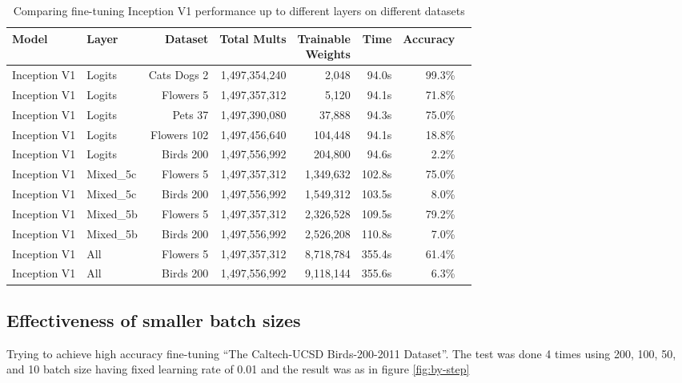 \begin{table*}\caption{Comparing fine-tuning Inception V1 performance up to different layers on different datasets}\label{table:fine-tune-inception-v1}
\centering
\begin{small}
\begin{tabularx}{\textwidth}{llrrrrrr}
\toprule
Model & Layer & Dataset & Total Mults & \makecell{Trainable \\ Weights} & Time & Accuracy \\
\midrule
Inception V1 & Logits   & Cats Dogs 2   & 1,497,354,240 &     2,048 &   94.0s & 99.3\% \\
Inception V1 & Logits   & Flowers 5     & 1,497,357,312 &     5,120 &   94.1s & 71.8\% \\
Inception V1 & Logits   & Pets 37       & 1,497,390,080 &    37,888 &   94.3s & 75.0\% \\
Inception V1 & Logits   & Flowers 102   & 1,497,456,640 &   104,448 &   94.1s & 18.8\% \\
Inception V1 & Logits   & Birds 200     & 1,497,556,992 &   204,800 &   94.6s & 2.2\% \\
\midrule
Inception V1 & Mixed\_5c & Flowers 5     &  1,497,357,312 & 1,349,632 & 102.8s & 75.0\% \\
Inception V1 & Mixed\_5c & Birds 200     &  1,497,556,992 & 1,549,312 & 103.5s & 8.0\% \\
\midrule
Inception V1 & Mixed\_5b & Flowers 5     &  1,497,357,312 & 2,326,528 & 109.5s & 79.2\% \\
Inception V1 & Mixed\_5b & Birds 200     &  1,497,556,992 & 2,526,208 & 110.8s & 7.0\% \\
\midrule
Inception V1 & All      & Flowers 5     &  1,497,357,312 & 8,718,784 &  355.4s & 61.4\% \\
Inception V1 & All      & Birds 200     &  1,497,556,992 & 9,118,144 &  355.6s & 6.3\% \\
\bottomrule
\end{tabularx}
\end{small}
\end{table*}

\subsection{Effectiveness of smaller batch sizes}

Trying to achieve high accuracy fine-tuning ``The Caltech-UCSD Birds-200-2011 Dataset''\autocite{WahCUB_200_2011}.
The test was done 4 times using 200, 100, 50, and 10 batch size having fixed learning rate of 0.01 and the result
was as in figure \ref{fig:by-step}

